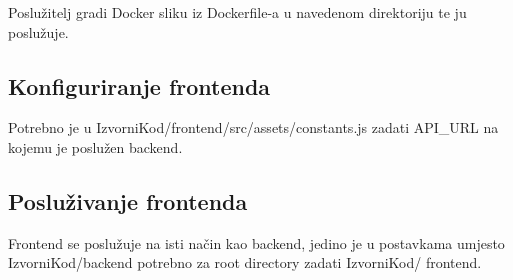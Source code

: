 Poslužitelj gradi Docker sliku iz Dockerfile-a u navedenom direktoriju te ju 
poslužuje.

\subsection{Konfiguriranje frontenda}

Potrebno je u IzvorniKod/frontend/src/assets/constants.js zadati API_URL na 
kojemu je poslužen backend.

\subsection{Posluživanje frontenda}

Frontend se poslužuje na isti način kao backend, jedino je u postavkama 
umjesto IzvorniKod/backend potrebno za root directory zadati IzvorniKod/
frontend.

\eject 